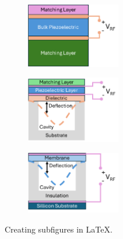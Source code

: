 \begin{figure}
  \centering
  \begin{subfigure}[][][t]{0.3\textwidth}
      \includegraphics[width=0.45\textwidth]{Chapters/Figures/Ch2_UltrasoundFundamentals/bulk_piezoelectric.pdf}
      \label{fig:ch3_bulk_piezo}
  \end{subfigure}
  \begin{subfigure}[][][b]{0.3\textwidth}
      \includegraphics[width=0.45\textwidth]{Chapters/Figures/Ch2_UltrasoundFundamentals/pmut.pdf}
      \label{fig:ch3_pmut}
  \end{subfigure}
  \begin{subfigure}[][][b]{0.3\textwidth}
      \includegraphics[width=0.45\textwidth]{Chapters/Figures/Ch2_UltrasoundFundamentals/cmut.pdf}
      \label{fig:ch3_cmut}
  \end{subfigure}

  \caption{Creating subfigures in \LaTeX.}
  \label{fig:ch3_transducer_types}
\end{figure}

